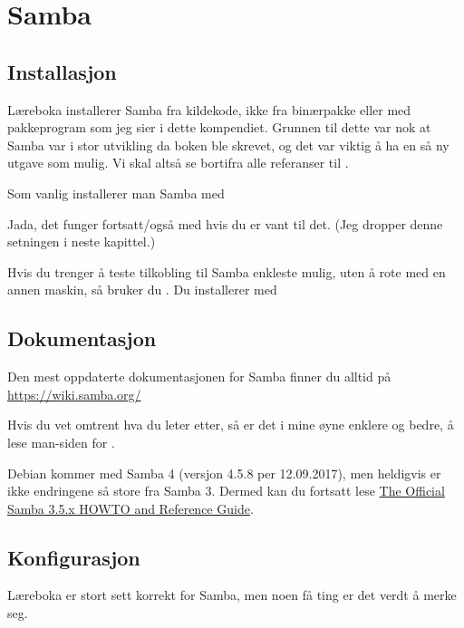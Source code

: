 \chapter{Samba} %


\section{Installasjon}

Læreboka installerer Samba fra kildekode, ikke fra binærpakke eller
med pakkeprogram som jeg sier i dette kompendiet. Grunnen til dette 
var nok at Samba var i stor utvikling da boken ble skrevet, og det var
viktig å ha en så ny utgave som mulig. Vi skal altså se bortifra alle 
referanser til .

Som vanlig installerer man Samba med 


Jada, det funger fortsatt/også med  hvis du er vant til det.
(Jeg dropper denne setningen i neste kapittel.)

Hvis du trenger å teste tilkobling til Samba enkleste mulig, uten å rote 
med en annen maskin, så bruker du . Du installerer med



\section{Dokumentasjon}

Den mest oppdaterte dokumentasjonen for Samba finner
du alltid på \url{https://wiki.samba.org/} 

Hvis du vet omtrent hva du leter etter, så er det i mine øyne
enklere og bedre, å lese man-siden for . 

Debian kommer med Samba 4 (versjon 4.5.8 per 12.09.2017), men heldigvis er ikke 
endringene så store fra Samba 3. Dermed kan du fortsatt lese
\href{https://www.samba.org/samba/docs/man/Samba3-HOWTO/}%
{The Official Samba 3.5.x HOWTO and Reference Guide}.


\section{Konfigurasjon}

Læreboka er stort sett korrekt for Samba, men noen få ting er det verdt å merke seg.

